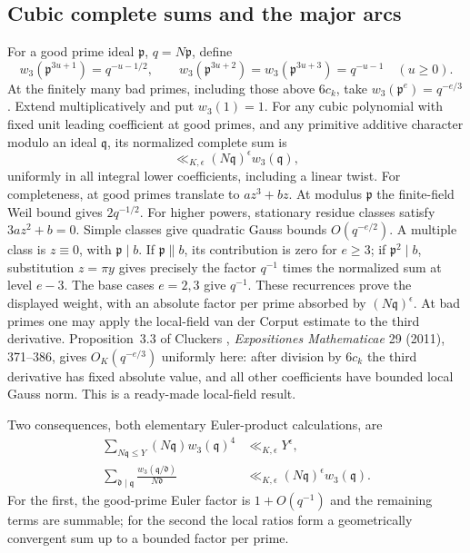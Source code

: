 \documentclass[11pt,reqno]{amsart}
\numberwithin{equation}{section}
\theoremstyle{definition}
\begin{document}
\subsection{Cubic complete sums and the major arcs}

For a good prime ideal $\mathfrak p$, $q=N\mathfrak p$, define
\[
 w_3(\mathfrak p^{3u+1})=q^{-u-1/2},\qquad
 w_3(\mathfrak p^{3u+2})=w_3(\mathfrak p^{3u+3})=q^{-u-1}
 \quad(u\ge0).
\]
At the finitely many bad primes, including those above $6c_k$, take
$w_3(\mathfrak p^e)=q^{-e/3}$.  Extend multiplicatively and put $w_3(1)=1$.
For any cubic polynomial with fixed unit leading coefficient at good primes,
and any primitive additive character modulo an ideal $\mathfrak q$,
its normalized complete sum is
\begin{equation}\label{eq:g7-complete}
 \ll_{K,\epsilon}(N\mathfrak q)^\epsilon w_3(\mathfrak q),
\end{equation}
uniformly in all integral lower coefficients, including a linear twist.
For completeness, at good primes translate to $az^3+bz$.
At modulus $\mathfrak p$ the finite-field Weil bound gives $2q^{-1/2}$.
For higher powers, stationary residue classes satisfy $3az^2+b=0$.
Simple classes give quadratic Gauss bounds $O(q^{-e/2})$.
A multiple class is $z\equiv0$, with $\mathfrak p\mid b$.
If $\mathfrak p\parallel b$, its contribution is zero for $e\ge3$;
if $\mathfrak p^2\mid b$, substitution $z=\pi y$ gives precisely the
factor $q^{-1}$ times the normalized sum at level $e-3$.
The base cases $e=2,3$ give $q^{-1}$.  These recurrences prove the displayed
weight, with an absolute factor per prime absorbed by $(N\mathfrak q)^\epsilon$.
At bad primes one may apply the local-field van der Corput estimate to the
third derivative.  Proposition~3.3 of Cluckers \cite{Cluckers2011}, \emph{Expositiones Mathematicae}
29 (2011), 371--386, gives $O_K(q^{-e/3})$ uniformly here: after division by
$6c_k$ the third derivative has fixed absolute value, and all other coefficients
have bounded local Gauss norm.  This is a ready-made local-field result.

Two consequences, both elementary Euler-product calculations, are
\begin{align}
 \sum_{N\mathfrak q\le Y}(N\mathfrak q)w_3(\mathfrak q)^4
       &\ll_{K,\epsilon}Y^\epsilon,\label{eq:g7-wsum}\\
 \sum_{\mathfrak d\mid\mathfrak q}
       \frac{w_3(\mathfrak q/\mathfrak d)}{N\mathfrak d}
       &\ll_{K,\epsilon}(N\mathfrak q)^\epsilon w_3(\mathfrak q).
       \label{eq:g7-wconv}
\end{align}
For the first, the good-prime Euler factor is $1+O(q^{-1})$ and the remaining
terms are summable; for the second the local ratios form a geometrically
convergent sum up to a bounded factor per prime.
\end{document}

